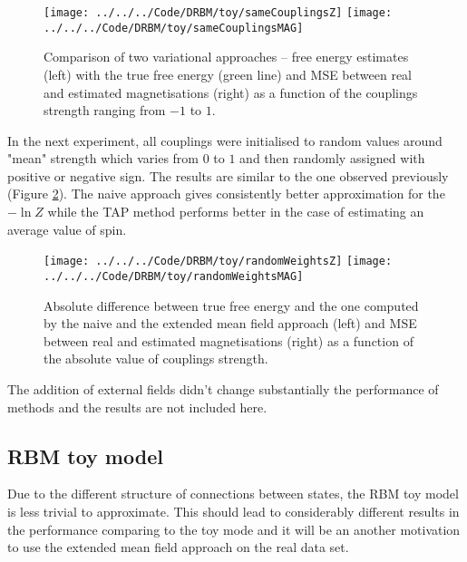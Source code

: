 \begin{figure}[!htb]
%
\texttt{[image: ../../../Code/DRBM/toy/sameCouplingsZ]}
\endminipage 
{}  
\texttt{[image: ../../../Code/DRBM/toy/sameCouplingsMAG]}
\endminipage\hfill
  \caption[Results on grid toy model with uniform couplings' strength]{Comparison of two  variational approaches -- free energy estimates (left) with the true free energy (green line) and MSE between real and estimated magnetisations (right) as a function of the couplings strength ranging from $-1$ to $1$.}
  \label{fig:gridModel}
\end{figure}

In the next experiment, all couplings were initialised to random values around "mean" strength which varies from $0$ to $1$ and then randomly assigned with positive or negative sign. The results are similar to the one observed previously (Figure \ref{fig:gridModelCoup}). The naive approach gives consistently better approximation for the $-\ln Z$ while the TAP method performs better in the case of estimating an average value of spin. 

\begin{figure}[!htb]
%
\texttt{[image: ../../../Code/DRBM/toy/randomWeightsZ]}
\endminipage 
{}  
\texttt{[image: ../../../Code/DRBM/toy/randomWeightsMAG]}
\endminipage\hfill
  \caption[Results on grid toy model with random couplings' strength]{Absolute difference between true free energy and the one computed by the naive and the extended mean field approach (left) and MSE between real and estimated magnetisations (right) as a function of the absolute value of couplings strength.}
  \label{fig:gridModelCoup}
\end{figure}

The addition of external fields didn't change substantially the performance of methods  and the results are not included here.

\subsection{RBM toy model}
Due to the different structure of connections between states, the RBM toy model is less trivial to approximate. This should lead to considerably different results in the performance comparing to the toy mode  and it will be an another motivation to use the extended mean field approach on the real data set.

